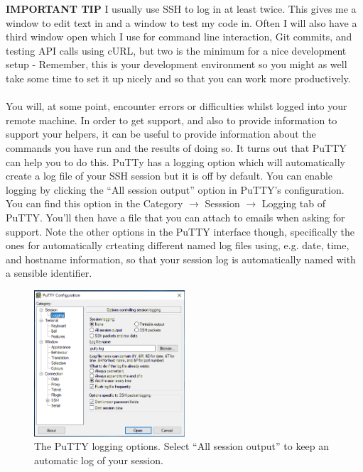 \documentclass[12pt, a4paper, oneside]{book}
\begin{document}
\begin{framed}
\textbf{IMPORTANT TIP} I usually use SSH to log in at least twice. This gives me a window to edit text in and a window to test my code in. Often I will also have a third window open which I use for command line interaction, Git commits, and testing API calls using cURL, but two is the minimum for a nice development setup - Remember, this is your development environment so you might as well take some time to set it up nicely and so that you can work more productively.
\end{framed}

\paragraph{} You will, at some point, encounter errors or difficulties whilst logged into your remote machine. In order to get support, and also to provide information to support your helpers, it can be useful to provide information about the commands you have run and the results of doing so. It turns out that PuTTY can help you to do this. PuTTy has a logging option which will automatically create a log file of your SSH session but it is off by default. You can enable logging by clicking the ``All session output'' option in PuTTY's configuration. You can find this option in the Category $\to$ Sesssion $\to$ Logging tab of PuTTY. You'll then have a file that you can attach to emails when asking for support. Note the other options in the PuTTY interface though, specifically the ones for automatically crteating different named log files using, e.g. date, time, and hostname information, so that your session log is automatically named with a sensible identifier.

\begin{figure}[H]
\centering
\includegraphics[width=0.5\textwidth]{images/putty_logs.png}
\caption{The PuTTY logging options. Select ``All session output'' to keep an automatic log of your session.}
\label{fig:putty-logging-options}
\end{figure}
\end{document}
